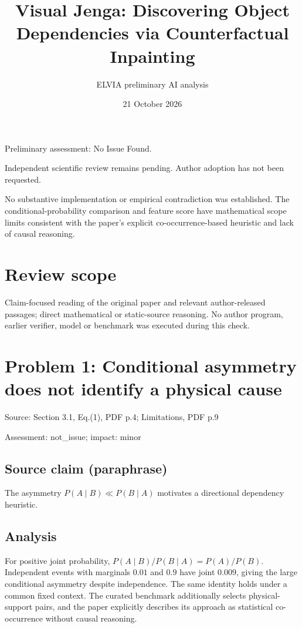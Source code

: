 \documentclass[11pt]{article}
\begin{document}
\title{Visual Jenga: Discovering Object Dependencies via Counterfactual Inpainting}

\author{ELVIA preliminary AI analysis}\date{21 October 2026}\maketitle

Preliminary assessment: No Issue Found.\par

Independent scientific review remains pending. Author adoption has not been requested.

No substantive implementation or empirical contradiction was established. The conditional-probability comparison and feature score have mathematical scope limits consistent with the paper’s explicit co-occurrence-based heuristic and lack of causal reasoning.

\section*{Review scope}

Claim-focused reading of the original paper and relevant author-released passages; direct mathematical or static-source reasoning. No author program, earlier verifier, model or benchmark was executed during this check.

\section*{Problem 1: Conditional asymmetry does not identify a physical cause}

Source: Section 3.1, Eq.(1), PDF p.4; Limitations, PDF p.9

Assessment: not\_issue; impact: minor

\subsection*{Source claim (paraphrase)}

The asymmetry \(P(A\mid B)\ll P(B\mid A)\) motivates a directional dependency heuristic.

\subsection*{Analysis}

For positive joint probability, \(P(A\mid B)/P(B\mid A)=P(A)/P(B)\). Independent events with marginals \(0.01\) and \(0.9\) have joint \(0.009\), giving the large conditional asymmetry despite independence. The same identity holds under a common fixed context. The curated benchmark additionally selects physical-support pairs, and the paper explicitly describes its approach as statistical co-occurrence without causal reasoning.
\end{document}
